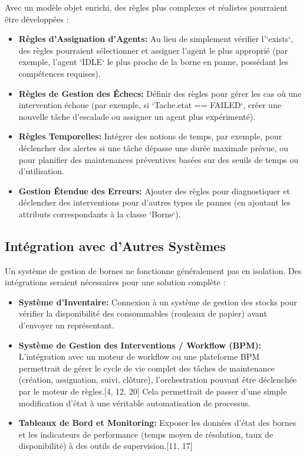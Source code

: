 \documentclass[11pt,a4paper]{article}
\begin{document}
Avec un modèle objet enrichi, des règles plus complexes et réalistes pourraient être développées :
\begin{itemize}
    \item \textbf{Règles d'Assignation d'Agents:} Au lieu de simplement vérifier l'`exists`, des règles pourraient sélectionner et assigner l'agent le plus approprié (par exemple, l'agent `IDLE` le plus proche de la borne en panne, possédant les compétences requises).
    \item \textbf{Règles de Gestion des Échecs:} Définir des règles pour gérer les cas où une intervention échoue (par exemple, si `Tache.etat == FAILED`, créer une nouvelle tâche d'escalade ou assigner un agent plus expérimenté).
    \item \textbf{Règles Temporelles:} Intégrer des notions de temps, par exemple, pour déclencher des alertes si une tâche dépasse une durée maximale prévue, ou pour planifier des maintenances préventives basées sur des seuils de temps ou d'utilisation.
    \item \textbf{Gestion Étendue des Erreurs:} Ajouter des règles pour diagnostiquer et déclencher des interventions pour d'autres types de pannes (en ajoutant les attributs correspondants à la classe `Borne`).
\end{itemize}

\subsection{Intégration avec d'Autres Systèmes}

Un système de gestion de bornes ne fonctionne généralement pas en isolation. Des intégrations seraient nécessaires pour une solution complète :
\begin{itemize}
    \item \textbf{Système d'Inventaire:} Connexion à un système de gestion des stocks pour vérifier la disponibilité des consommables (rouleaux de papier) avant d'envoyer un représentant.
    \item \textbf{Système de Gestion des Interventions / Workflow (BPM):} L'intégration avec un moteur de workflow ou une plateforme BPM permettrait de gérer le cycle de vie complet des tâches de maintenance (création, assignation, suivi, clôture), l'orchestration pouvant être déclenchée par le moteur de règles.[4, 12, 20] Cela permettrait de passer d'une simple modification d'état à une véritable automatisation de processus.
    \item \textbf{Tableaux de Bord et Monitoring:} Exposer les données d'état des bornes et les indicateurs de performance (temps moyen de résolution, taux de disponibilité) à des outils de supervision.[11, 17]
\end{itemize}
\end{document}
